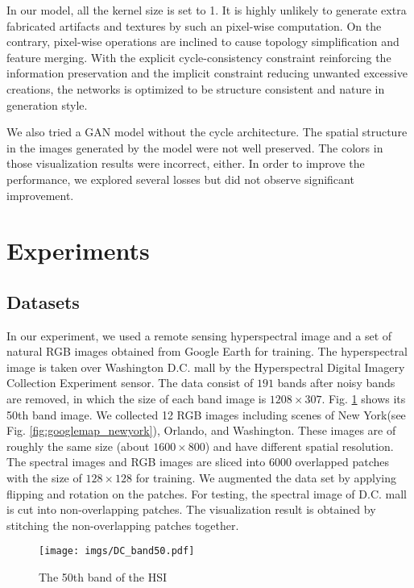 \documentclass[10pt,conference,a4paper]{IEEEtran}
\begin{document}
In our model, all the kernel size is set to 1. It is highly unlikely to generate extra fabricated artifacts and textures by such an pixel-wise computation.
On the contrary, pixel-wise operations are inclined to cause topology simplification and feature merging.
With the explicit cycle-consistency constraint reinforcing the information preservation and the implicit constraint reducing unwanted excessive creations, the networks is optimized to be structure consistent and nature in generation style.

We also tried a GAN model without the cycle architecture. The spatial structure in the images generated by the model were not well preserved. The colors in those visualization results were incorrect, either. In order to improve the performance, we explored several losses but did not observe significant improvement.

\section{Experiments}
\label{sec:experiments}

\subsection{Datasets}
In our experiment, we used a remote sensing hyperspectral image and a set of natural RGB images obtained  from Google Earth for training.
The hyperspectral image is taken over Washington D.C. mall by the Hyperspectral
Digital Imagery Collection Experiment sensor. The
data consist of $191$ bands after noisy bands are removed, in
which the size of each band image is $1208 \times 307$. Fig. \ref{fig:band50}  shows its 50th band image.
We collected 12 RGB images including scenes of New York(see Fig. \ref{fig:googlemap_newyork}), Orlando, and Washington. These images are of roughly the same size (about $1600 \times 800$) and have different spatial resolution.
The spectral images and RGB images are sliced into 6000 overlapped patches with the size of $128\times 128$ for training.
We augmented the data set by applying flipping and rotation on the patches.
For testing, the spectral image of D.C. mall is cut into non-overlapping patches.
The visualization result is obtained by stitching the non-overlapping patches together.

\begin{figure}[t]
\centering
\texttt{[image: imgs/DC\_band50.pdf]}
\caption{The 50th band of the HSI}\label{fig:band50}
\end{figure}
\end{document}
